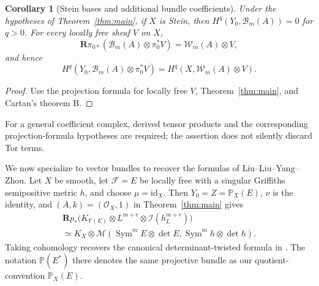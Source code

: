 \documentclass[11pt,reqno]{amsart}
\numberwithin{equation}{section}
\newtheorem{corollary}[theorem]{Corollary}
\theoremstyle{definition}
\theoremstyle{remark}
\newcommand{\OO}{\mathcal O}
\newcommand{\FF}{\mathcal F}
\newcommand{\MM}{\mathcal M}
\newcommand{\II}{\mathcal I}
\newcommand{\WW}{\mathcal W}
\newcommand{\BB}{\mathcal B}
\newcommand{\PP}{\mathbb P}
\newcommand{\RR}{\mathbf R}
\newcommand{\Sym}{\operatorname{Sym}}
\begin{document}
\begin{corollary}[Stein bases and additional bundle coefficients]\label{cor:Stein}
Under the hypotheses of Theorem~\ref{thm:main}, if $X$ is Stein, then
$H^q(Y_0,\BB_m(A))=0$ for $q>0$. For every locally free sheaf $V$ on $X$,
\[
 \RR\pi_{0*}(\BB_m(A)\otimes\pi_0^*V)=\WW_m(A)\otimes V,
\]
and hence
\[
 H^q(Y_0,\BB_m(A)\otimes\pi_0^*V)
       =H^q(X,\WW_m(A)\otimes V).
\]
\end{corollary}
\begin{proof}
Use the projection formula for locally free $V$, Theorem~\ref{thm:main}, and Cartan's theorem B.
\end{proof}
For a general coefficient complex, derived tensor products and the corresponding projection-formula hypotheses are required; the assertion does not silently discard Tor terms.

We now specialize to vector bundles to recover the formulas of Liu--Liu--Yang--Zhou. Let $X$ be smooth, let $\FF=E$ be locally free with a singular Griffiths semipositive metric $h$, and choose $\mu=\mathrm{id}_X$. Then $Y_0=Z=\PP_X(E)$, $\nu$ is the identity, and $(A,k)=(\OO_X,1)$ in Theorem~\ref{thm:main} gives
\begin{multline}\label{eq:recover-canonical}
 \RR p_*\bigl(K_{\PP(E)}\otimes L^{m+r}\otimes\II(h_L^{m+r})\bigr)\\
 \simeq K_X\otimes\MM(\Sym^mE\otimes\det E,
                                   \Sym^mh\otimes\det h).
\end{multline}
Taking cohomology recovers the canonical determinant-twisted formula in \cite[Theorem 1.6(i)]{LLYZpre}. The notation $\PP(E^*)$ there denotes the same projective bundle as our quotient-convention $\PP_X(E)$.
\end{document}
